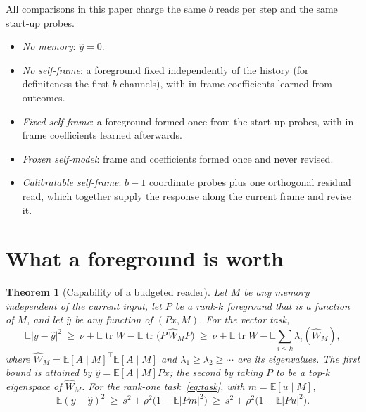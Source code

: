 \documentclass[12pt]{article}
\newtheorem{theorem}{Theorem}
\theoremstyle{definition}
\newcommand{\E}{\mathbb E}
\newcommand{\tr}{\operatorname{tr}}
\begin{document}
All comparisons in this paper charge the same $b$ reads per step and the same start-up probes.
\begin{itemize}
\item \emph{No memory}: $\hat y=0$.
\item \emph{No self-frame}: a foreground fixed independently of the history (for definiteness the first $b$ channels), with in-frame coefficients learned from outcomes.
\item \emph{Fixed self-frame}: a foreground formed once from the start-up probes, with in-frame coefficients learned afterwards.
\item \emph{Frozen self-model}: frame and coefficients formed once and never revised.
\item \emph{Calibratable self-frame}: $b-1$ coordinate probes plus one orthogonal residual read, which together supply the response along the current frame and revise it.
\end{itemize}

\section{What a foreground is worth}
\label{sec:capability}

\begin{theorem}[Capability of a budgeted reader]
\label{thm:capability}
Let $M$ be any memory independent of the current input, let $P$ be a rank-$k$ foreground that is a function of $M$, and let $\hat y$ be any function of $(Px,M)$. For the vector task,
\begin{equation}
\label{eq:capability_general}
\E|y-\hat y|^2\ \ge\ \nu+\E\tr W-\E\tr\bigl(P\,\widehat W_MP\bigr)\ \ge\ \nu+\E\tr W-\E\sum_{i\le k}\lambda_i(\widehat W_M),
\end{equation}
where $\widehat W_M=\E[A\mid M]^{\top}\E[A\mid M]$ and $\lambda_1\ge\lambda_2\ge\cdots$ are its eigenvalues. The first bound is attained by $\hat y=\E[A\mid M]Px$; the second by taking $P$ to be a top-$k$ eigenspace of $\widehat W_M$. For the rank-one task~\eqref{eq:task}, with $m=\E[u\mid M]$,
\begin{equation}
\label{eq:capability}
\E(y-\hat y)^2\ \ge\ s^2+\rho^2\bigl(1-\E|Pm|^2\bigr)\ \ge\ s^2+\rho^2\bigl(1-\E|Pu|^2\bigr).
\end{equation}
\end{theorem}
\end{document}
